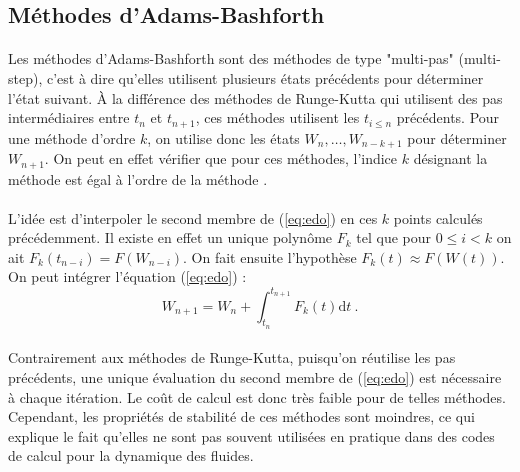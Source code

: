   \subsection{Méthodes d'Adams-Bashforth}

    \paragraph{}
    Les méthodes d'Adams-Bashforth sont des méthodes de type "multi-pas" (multi-step), c'est à dire qu'elles utilisent plusieurs états précédents pour déterminer l'état suivant.
    À la différence des méthodes de Runge-Kutta qui utilisent des pas intermédiaires entre $t_n$ et $t_{n+1}$, ces méthodes utilisent les $t_{i\leq n}$ précédents.
    Pour une méthode d'ordre $k$, on utilise donc les états $W_n, \dots, W_{n-k+1}$ pour déterminer $W_{n+1}$.
    On peut en effet vérifier que pour ces méthodes, l'indice $k$ désignant la méthode est égal à l'ordre de la méthode \cite{HairerNorsettWanner1993}.

    \paragraph{}
    L'idée est d'interpoler le second membre de (\ref{eq:edo}) en ces $k$ points calculés précédemment.
    Il existe en effet un unique polynôme $F_k$ tel que pour $0 \leq i < k$ on ait $F_k\left(t_{n-i}\right) = F\left(W_{n-i}\right)$.
    On fait ensuite l'hypothèse $F_k\left(t\right) \approx F\left(W\left(t\right)\right)$.
    On peut intégrer l'équation (\ref{eq:edo}) :
    \[W_{n+1} = W_n + \int_{t_n}^{t_{n+1}}F_k\left(t\right)\mathrm{d}t\ .\]

    \paragraph{}
    Contrairement aux méthodes de Runge-Kutta, puisqu'on réutilise les pas précédents, une unique évaluation du second membre de (\ref{eq:edo}) est nécessaire à chaque itération.
    Le coût de calcul est donc très faible pour de telles méthodes.
    Cependant, les propriétés de stabilité de ces méthodes sont moindres, ce qui explique le fait qu'elles ne sont pas souvent utilisées en pratique dans des codes de calcul pour la dynamique des fluides.


